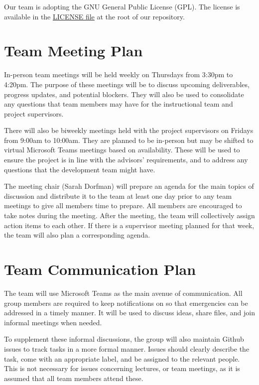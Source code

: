 \documentclass{article}
\begin{document}
Our team is adopting the GNU General Public License (GPL).
The license is available in the
\href{https://github.com/lilyporter/Ghoti/blob/main/LICENSE}{LICENSE file}
at the root of our repository.

\section{Team Meeting Plan}

\indent In-person team meetings will be held weekly on Thursdays from 3:30pm to 4:20pm. The purpose of these meetings will be to discuss upcoming deliverables, progress updates, and potential blockers. They will also be used to consolidate any questions that team members may have for the instructional team and project supervisors.

\indent There will also be biweekly meetings held with the project supervisors on Fridays from 9:00am to 10:00am. They are planned to be in-person but may be shifted to virtual Microsoft Teams meetings based on availability. These will be used to ensure the project is in line with the advisors’ requirements, and to address any questions that the development team might have.

\indent The meeting chair (Sarah Dorfman) will prepare an agenda for the main topics of discussion and distribute it to the team at least one day prior to any team meetings to give all members time to prepare. All members are encouraged to take notes during the meeting. After the meeting, the team will collectively assign action items to each other. If there is a supervisor meeting planned for that week, the team will also plan a corresponding agenda. 


\section{Team Communication Plan}

\indent The team will use Microsoft Teams as the main avenue of communication. All group members are required to keep notifications on so that emergencies can be addressed in a timely manner. It will be used to discuss ideas, share files, and join informal meetings when needed. 

\indent To supplement these informal discussions, the group will also maintain Github issues to track tasks in a more formal manner. Issues should clearly describe the task, come with an appropriate label, and be assigned to the relevant people. This is not necessary for issues concerning lectures, or team meetings, as it is assumed that all team members attend these.
\end{document}
